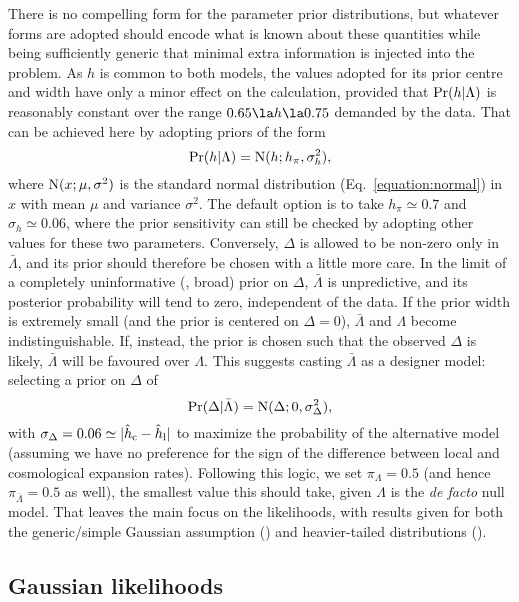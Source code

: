 \documentclass[a4paper,fleqn,usenatbib]{mnras}
\newcommand{\psame}{\pi_\Lambda}
\newcommand{\pdiff}{\pi_{\bar{\Lambda}}}
\newcommand{\msame}{\Lambda}
\newcommand{\mdiff}{\bar{\Lambda}}
\newcommand{\hlobs}{\hat{h}_{\rm l}}
\newcommand{\hcobs}{\hat{h}_{\rm c}}
\begin{document}
{There is no compelling form for the parameter prior distributions,
but whatever forms are adopted should encode what is known
about these quantities while being sufficiently generic that 
minimal extra information is injected into the problem.
As $h$ is common to both models,
the values adopted for its prior centre and width 
have only a minor effect on the calculation, provided that
$\prob(h | \msame)$ is reasonably constant over the range
$0.65 \la h \la 0.75$ demanded by the data.
That can be achieved here by adopting priors of the form
\begin{equation}
\prob(h | \msame) = \normal(h; h_\pi, \sigma_h^2),
\end{equation}
where ${\rm N}(x; \mu, \sigma^2)$
is the standard normal
distribution (Eq.~\ref{equation:normal}) in $x$ with mean $\mu$ and
variance $\sigma^2$.
The default option is to take $h_\pi \simeq 0.7$ and $\sigma_h \simeq 0.06$,
where the prior sensitivity can still be checked by adopting other 
values for these two parameters. Conversely, $\Delta$ is allowed to be non-zero
only in $\mdiff$, and its prior should therefore be chosen with a little more care. In the 
limit of a completely uninformative (\ie, broad) prior on $\Delta$, $\mdiff$ is 
unpredictive, and its posterior probability will tend to zero, independent of the data. If the 
prior width is extremely small (and the prior is centered on $\Delta = 0$), $\mdiff$ and $\msame$ become 
indistinguishable. If, instead, the prior is chosen such that the observed $\Delta$ 
is likely, $\mdiff$ will be favoured over $\msame$. This suggests casting 
$\mdiff$ as a designer model: selecting a prior on $\Delta$ of
\begin{equation}
\prob(\Delta | \mdiff) = \normal(\Delta; 0, \sigma_\Delta^2),
\end{equation}
with $\sigma_\Delta = 0.06 \simeq |\hcobs - \hlobs|$ to maximize the 
probability of the alternative model (assuming we have no preference 
for the sign of the difference between local and cosmological expansion 
rates). Following this logic, we set $\psame=0.5$ 
(and hence $\pdiff = 0.5$ as well), the smallest value 
this should take, given $\msame$ is the {\it de facto} null model. 
That leaves the main focus on the likelihoods, 
with results given for both the generic/simple Gaussian assumption
()
and heavier-tailed distributions 
().


\subsection{Gaussian likelihoods}
\label{section:gausslik}

}
\end{document}
